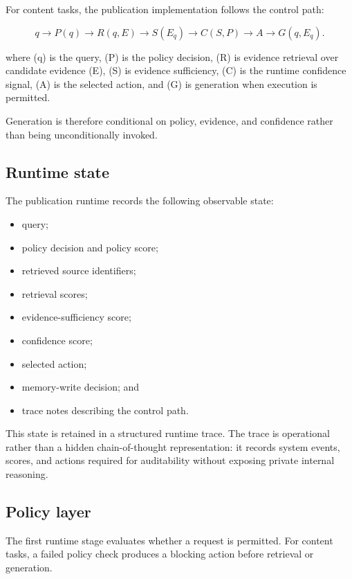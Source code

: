 \documentclass[manuscript, screen, review]{jair}
\begin{document}
For content tasks, the publication implementation follows the control path:

\begin{equation}
q \rightarrow P(q) \rightarrow R(q,E) \rightarrow S(E_q)
\rightarrow C(S,P) \rightarrow A \rightarrow G(q,E_q).
\label{eq:runtime-path}
\end{equation}

where (q) is the query, (P) is the policy decision, (R) is evidence
retrieval over candidate evidence (E), (S) is evidence sufficiency,
(C) is the runtime confidence signal, (A) is the selected action, and
(G) is generation when execution is permitted.

Generation is therefore conditional on policy, evidence, and confidence rather
than being unconditionally invoked.

\subsection{Runtime state}

The publication runtime records the following observable state:

\begin{itemize}
\item query;
\item policy decision and policy score;
\item retrieved source identifiers;
\item retrieval scores;
\item evidence-sufficiency score;
\item confidence score;
\item selected action;
\item memory-write decision; and
\item trace notes describing the control path.
\end{itemize}

This state is retained in a structured runtime trace. The trace is operational
rather than a hidden chain-of-thought representation: it records system events,
scores, and actions required for auditability without exposing private internal
reasoning.

\subsection{Policy layer}

The first runtime stage evaluates whether a request is permitted. For content
tasks, a failed policy check produces a blocking action before retrieval or
generation.
\end{document}
